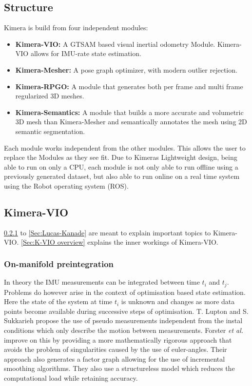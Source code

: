 \documentclass[11pt,a4paper]{article}
\begin{document}
\subsection{Structure}
Kimera is build from four independent modules: 
\begin{itemize}
    \item \textbf{Kimera-VIO:} A GTSAM \cite{gtsam} based visual inertial odometry Module. Kimera-VIO allows for IMU-rate state estimation. 
    \item \textbf{Kimera-Mesher:} A pose graph optimizer, with modern outlier rejection.
    \item \textbf{Kimera-RPGO:} A module that generates both per frame and multi frame regularized 3D meshes. 
    \item \textbf{Kimera-Semantics:} A module that builds a more accurate and volumetric 3D mesh than Kimera-Mesher and semantically annotates the mesh using 2D semantic segmentation. 
\end{itemize}
Each module works independent from the other modules. This allows the user to replace the Modules as they see fit. 
Due to Kimeras Lightweight design, being able to run on only a CPU, each module is not only able to run  offline using a previously generated dataset, but also able to run online on a real time system using the Robot operating system (ROS).


\subsection{Kimera-VIO}
\ref{pre:on-manifold} to \ref{Sec:Lucas-Kanade} are meant to explain important topics to Kimera-VIO.
\ref{Sec:K-VIO overview} explains the inner workings of Kimera-VIO.
\subsubsection{On-manifold preintegration} \label{pre:on-manifold}
In theory the IMU measurements can be integrated between time $t_i$ and $t_j$.
Problems do however arise in the context of optimisation based state estimation. 
Here the state of the system at time $t_i$ is unknown and changes as more data points become available during successive steps of optimisation.
T. Lupton and S. Sukkarieh \cite{preint_lupton} propose the use of pseudo measurements independent from the instal conditions which only describe the motion between measurements.
Forster \textit{et al.} \cite{Forster_2017} improve on this by providing a more mathematically rigorous approach that avoids the problem of singularities caused by the use of euler-angles. 
Their approach also generates a factor graph allowing for the use of incremental smoothing algorithms. 
They also use a structureless model which reduces the computational load while retaining accuracy.
\end{document}
